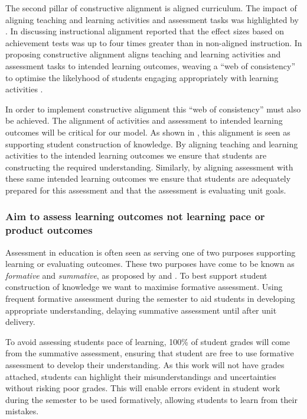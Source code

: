 The second pillar of constructive alignment is aligned curriculum. The impact of aligning teaching and learning activities and assessment tasks was highlighted by \citet{Cohen:1987}. In discussing instructional alignment \citet{Cohen:1987} reported that the effect sizes based on achievement tests was up to four times greater than in non-aligned instruction. In proposing constructive alignment \citet{Biggs:1996c} aligns teaching and learning activities and assessment tasks to intended learning outcomes, weaving a ``web of consistency'' to optimise the likelyhood of students engaging appropriately with learning activities \cite{Biggs:1999}. 

In order to implement constructive alignment this ``web of consistency'' must also be achieved. The alignment of activities and assessment to intended learning outcomes will be critical for our model. As shown in , this alignment is seen as supporting student construction of knowledge. By aligning teaching and learning activities to the intended learning outcomes we ensure that students are constructing the required understanding. Similarly, by aligning assessment with these same intended learning outcomes we ensure that students are adequately prepared for this assessment and that the assessment is evaluating unit goals. 



\subsubsection{Aim to assess learning outcomes not learning pace or product outcomes} %
\label{ssub:aim_to_assess_learning_outcomes_not_learning_pace_or_product_outcomes_}

Assessment in education is often seen as serving one of two purposes supporting learning or evaluating outcomes. These two purposes have come to be known as \emph{formative} and \emph{summative}, as proposed by \citet{Scriven:1967} and \citet{Bloom:1969}. To best support student construction of knowledge we want to maximise formative assessment. Using frequent formative assessment during the semester to aid students in developing appropriate understanding, delaying summative assessment until after unit delivery.

To avoid assessing students pace of learning, 100\% of student grades will come from the summative assessment, ensuring that student are free to use formative assessment to develop their understanding. As this work will not have grades attached, students can highlight their misunderstandings and uncertainties without risking poor grades. This will enable errors evident in student work during the semester to be used formatively, allowing students to learn from their mistakes. 

